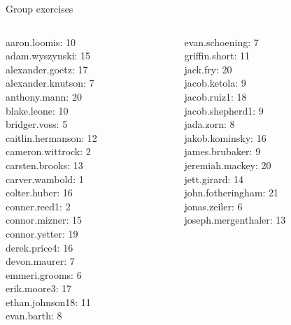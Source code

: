 \documentclass[10pt]{beamer}
\begin{document}
\begin{frame}[standout]
Group exercises
\end{frame}

\begin{frame}
\footnotesize 
\vfill 
\begin{columns}
\begin{column}{0.33\textwidth}
aaron.loomis: 10 \\ 
adam.wyszynski: 15 \\ 
alexander.goetz: 17 \\ 
alexander.knutson: 7 \\ 
anthony.mann: 20 \\ 
blake.leone: 10 \\ 
bridger.voss: 5 \\ 
caitlin.hermanson: 12 \\ 
cameron.wittrock: 2 \\ 
carsten.brooks: 13 \\ 
carver.wambold: 1 \\ 
colter.huber: 16 \\ 
conner.reed1: 2 \\ 
connor.mizner: 15 \\ 
connor.yetter: 19 \\ 
derek.price4: 16 \\ 
devon.maurer: 7 \\ 
emmeri.grooms: 6 \\ 
erik.moore3: 17 \\ 
ethan.johnson18: 11 \\ 
evan.barth: 8 \\\end{column}
\begin{column}{0.33\textwidth}
evan.schoening: 7 \\ 
griffin.short: 11 \\ 
jack.fry: 20 \\ 
jacob.ketola: 9 \\ 
jacob.ruiz1: 18 \\ 
jacob.shepherd1: 9 \\ 
jada.zorn: 8 \\ 
jakob.kominsky: 16 \\ 
james.brubaker: 9 \\ 
jeremiah.mackey: 20 \\ 
jett.girard: 14 \\ 
john.fotheringham: 21 \\ 
jonas.zeiler: 6 \\ 
joseph.mergenthaler: 13 \\ 

\end{column}
\end{columns}
\end{frame}
\end{document}
